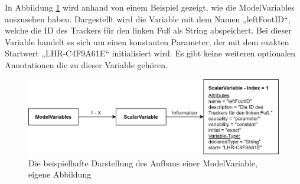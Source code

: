 In Abbildung \ref{fig:ModelVariables} wird anhand von einem Beispiel gezeigt, wie die ModelVariables auszusehen haben. Dargestellt wird die Variable mit dem Namen „leftFootID“, welche die ID des Trackers für den linken Fuß als String abspeichert. Bei dieser Variable handelt es sich um einen konstanten Parameter, der mit dem exakten Startwert „LHR-C4F9A61E“ initialisiert wird. Es gibt keine weiteren optionalen Annotationen die zu dieser Variable gehören.
\begin{figure}[h]
	\centering
	\includegraphics[width=1\linewidth]{Bilder/A30_ModelVariables}
	\caption{Die beispielhafte Darstellung des Aufbaus einer ModelVariable, eigene Abbildung}
	\label{fig:ModelVariables}
\end{figure}
\newpage

